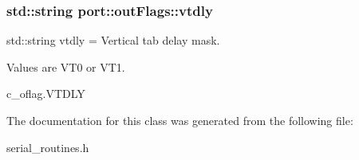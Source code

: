\subsubsection[{\texorpdfstring{vtdly}{vtdly}}]{\setlength{\rightskip}{0pt plus 5cm}std\+::string port\+::out\+Flags\+::vtdly}\hypertarget{classport_1_1outFlags_adb8648cf7a33c834075f94396029ef93}{}\label{classport_1_1outFlags_adb8648cf7a33c834075f94396029ef93}


std\+::string vtdly = Vertical tab delay mask. 

Values are V\+T0 or V\+T1. 

c\+\_\+oflag.\+V\+T\+D\+LY

The documentation for this class was generated from the following file\+:\begin{DoxyCompactItemize}
\item 
serial\+\_\+routines.\+h\end{DoxyCompactItemize}
